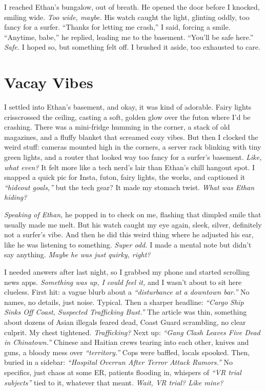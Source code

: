 \documentclass[12pt]{article} %
\begin{document}
I reached \textnormal{Ethan}’s bungalow, out of breath. He opened the door before I knocked, smiling wide. \textit{Too wide, maybe.} His watch caught the light, glinting oddly, too fancy for a surfer. “Thanks for letting me crash,” I said, forcing a smile. “Anytime, babe,” he replied, leading me to the basement. “You’ll be safe here.” \textit{Safe.} I hoped so, but something felt off. I brushed it aside, too exhausted to care.

\section{Vacay Vibes}

I settled into \textnormal{Ethan}’s basement, and okay, it was kind of adorable. Fairy lights crisscrossed the ceiling, casting a soft, golden glow over the futon where I’d be crashing. There was a mini-fridge humming in the corner, a stack of old magazines, and a fluffy blanket that screamed cozy vibes. But then I clocked the weird stuff: cameras mounted high in the corners, a server rack blinking with tiny green lights, and a router that looked way too fancy for a surfer’s basement. \textit{Like, what even?} It felt more like a tech nerd’s lair than \textnormal{Ethan}’s chill hangout spot. I snapped a quick pic for Insta, futon, fairy lights, the works, and captioned it \textit{“hideout goals,”} but the tech gear? It made my stomach twist. \textit{What was \textnormal{Ethan} hiding?}

\textit{Speaking of \textnormal{Ethan},} he popped in to check on me, flashing that dimpled smile that usually made me melt. But his watch caught my eye again, sleek, silver, definitely not a surfer’s vibe. And then he did this weird thing where he adjusted his ear, like he was listening to something. \textit{Super odd.} I made a mental note but didn’t say anything. \textit{Maybe he was just quirky, right?}

I needed answers after last night, so I grabbed my phone and started scrolling news apps. \textit{Something was up, I could feel it,} and I wasn’t about to sit here clueless. First hit: a vague blurb about a \textit{“disturbance at a downtown bar.”} No names, no details, just noise. Typical. Then a sharper headline: \textit{“Cargo Ship Sinks Off Coast, Suspected Trafficking Bust.”} The article was thin, something about dozens of Asian illegals feared dead, Coast Guard scrambling, no clear culprit. My chest tightened. \textit{Trafficking?} Next up: \textit{“Gang Clash Leaves Five Dead in Chinatown.”} Chinese and Haitian crews tearing into each other, knives and guns, a bloody mess over \textit{“territory.”} Cops were baffled, locals spooked. Then, buried in a sidebar: \textit{“Hospital Overrun After Terror Attack Rumors.”} No specifics, just chaos at some ER, patients flooding in, whispers of \textit{“VR trial subjects”} tied to it, whatever that meant. \textit{Wait, VR trial? Like mine?}
\end{document}
